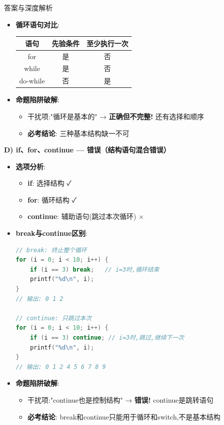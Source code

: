 \documentclass[a4paper,12pt]{article}
\begin{document}
\begin{bluebox}{答案与深度解析}
\begin{itemize}[leftmargin=*, nosep]
		\item \textbf{循环语句对比}:
		      \begin{tabular}{|c|c|c|}
			      \hline
			      \textbf{语句} & \textbf{先验条件} & \textbf{至少执行一次} \\
			      \hline
			      for         & 是             & 否               \\
			      \hline
			      while       & 是             & 否               \\
			      \hline
			      do-while    & 否             & 是               \\
			      \hline
		      \end{tabular}

		\item \textbf{命题陷阱破解}:
		      \begin{itemize}
			      \item 干扰项:"循环是基本的" → \textbf{正确但不完整!} 还有选择和顺序
			      \item \textbf{必考结论}: 三种基本结构缺一不可
		      \end{itemize}
	\end{itemize}

	\textbf{D) if、for、continue — 错误（结构语句混合错误）}
	\begin{itemize}[leftmargin=*, nosep]
		\item \textbf{选项分析}:
		      \begin{itemize}
			      \item \textbf{if}: 选择结构 ✓
			      \item \textbf{for}: 循环结构 ✓
			      \item \textbf{continue}: 辅助语句(跳过本次循环) ×
		      \end{itemize}

		\item \textbf{break与continue区别}:
		      \begin{lstlisting}[language=C]
// break: 终止整个循环
for (i = 0; i < 10; i++) {
    if (i == 3) break;   // i=3时,循环结束
    printf("%d\n", i);
}
// 输出: 0 1 2

// continue: 只跳过本次
for (i = 0; i < 10; i++) {
    if (i == 3) continue; // i=3时,跳过,继续下一次
    printf("%d\n", i);
}
// 输出: 0 1 2 4 5 6 7 8 9
    \end{lstlisting}

		\item \textbf{命题陷阱破解}:
		      \begin{itemize}
			      \item 干扰项:"continue也是控制结构" → \textbf{错误!} continue是跳转语句
			      \item \textbf{必考结论}: break和continue只能用于循环和switch,不是基本结构
		      \end{itemize}
	\end{itemize}


\end{bluebox}
\end{document}
